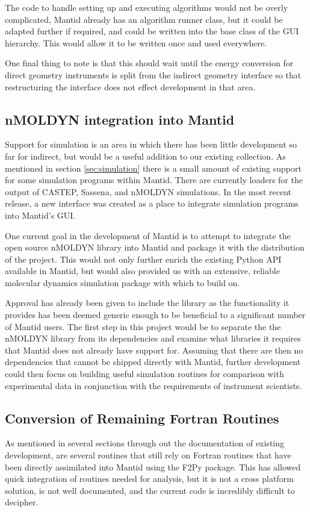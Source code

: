 \documentclass[paper=a4, fontsize=11pt]{scrartcl}	%
\numberwithin{equation}{section}															%
\numberwithin{figure}{section}																%
\numberwithin{table}{section}																%
\begin{document}
The code to handle setting up and executing algorithms would not be overly complicated, Mantid already has an algorithm runner class, but it could be adapted further if required, and could be written into the base class of the GUI hierarchy. This would allow it to be written once and used everywhere. 

One final thing to note is that this should wait until the energy conversion for direct geometry instruments is split from the indirect geometry interface so that restructuring the interface does not effect development in that area.

\subsection{nMOLDYN integration into Mantid}
Support for simulation is an area in which there has been little development so far for indirect, but would be a useful addition to our existing collection. As mentioned in section \ref{sec:simulation} there is a small amount of existing support for some simulation programs within Mantid. There are currently loaders for the output of CASTEP, Sassena, and nMOLDYN simulations. In the most recent release, a new interface was created as a place to integrate simulation programs into Mantid's GUI.

One current goal in the development of Mantid is to attempt to integrate the open source nMOLDYN library into Mantid and package it with the distribution of the project. This would not only further enrich the existing Python API available in Mantid, but would also provided us with an extensive, reliable molecular dynamics simulation package with which to build on.

Approval has already been given to include the library as the functionality it provides has been deemed generic enough to be beneficial to a significant number of Mantid users. The first step in this project would be to separate the the nMOLDYN library from its dependencies and examine what libraries it requires that Mantid does not already have support for. Assuming that there are then no dependencies that cannot be shipped directly with Mantid, further development could then focus on building useful simulation routines for comparison with experimental data in conjunction with the requirements of instrument scientists.

\subsection{Conversion of Remaining Fortran Routines}
\label{subsec:convert-fortran}
As mentioned in several sections through out the documentation of existing development, are several routines that still rely on Fortran routines that have been directly assimilated into Mantid using the F2Py package. This has allowed quick integration of routines needed for analysis, but it is not a cross platform solution, is not well documented, and the current code is incredibly difficult to decipher.
\end{document}
